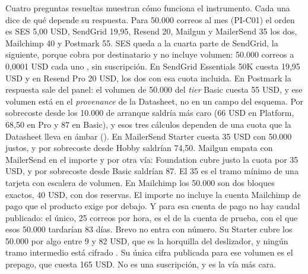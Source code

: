 Cuatro preguntas resueltas muestran cómo funciona el instrumento. Cada una dice de
qué depende su respuesta. Para 50.000 correos al mes (PI-C01) el orden es SES 5,00 USD,
SendGrid 19,95, Resend 20, Mailgun y MailerSend 35 los dos, Mailchimp 40 y Postmark 55.
SES queda a la cuarta parte de SendGrid, la siguiente, porque cobra por destinatario y no
incluye volumen: 50.000 correos a 0,0001 USD cada uno \citep{sespricing}, sin
suscripción.
En SendGrid \citep{sendgridpricing} Essentials 50K cuesta 19,95 USD y en Resend
\citep{resendpricing} Pro 20 USD, los dos con esa cuota incluida.
En Postmark \citep{postmarkpricing} la respuesta sale del panel: el volumen de 50.000
del \textit{tier} Basic cuesta 55 USD, y ese volumen está en el \textit{provenance} de
la Datasheet, no en un campo del esquema.
Por sobrecoste desde los 10.000 de arranque saldría más caro (66 USD en Platform, 68,50
en Pro y 87 en Basic), y esos tres cálculos dependen de una cuota que la Datasheet
lleva en ámbar (\semambar{}).
En MailerSend \citep{mailersendpricing} Starter cuesta 35 USD con 50.000 justos, y
por sobrecoste desde Hobby saldrían 74,50.
Mailgun \citep{mailgunpricing} empata con MailerSend en el importe y por otra vía:
Foundation cubre justo la cuota por 35 USD, y por sobrecoste desde Basic saldrían 87.
El 35 es el tramo mínimo de una tarjeta con escalera de volumen.
En Mailchimp \citep{mailchimppricing} los 50.000 son dos bloques exactos, 40 USD, con
dos reservas. El importe no incluye la cuenta Mailchimp de
pago que el producto exige por debajo. Y para esa cuenta de pago no hay caudal publicado: el
único, 25 correos por hora, es el de la cuenta de prueba, con el que esos 50.000 tardarían 83 días.
Brevo no entra con número. Su Starter cubre los 50.000 por algo entre 9 y 82 USD, que
es la horquilla del deslizador, y ningún tramo intermedio está cifrado
\citep{brevopricing}. Su única cifra publicada para ese volumen es el prepago, que cuesta 165 USD. No es una
suscripción, y es la vía más cara.


